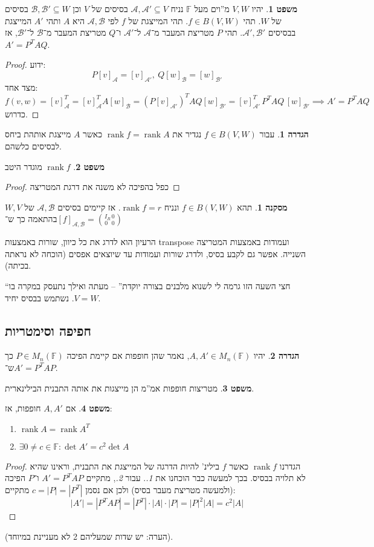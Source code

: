 \documentclass[a4paper]{article}
\newcommand\ac    {\mathcal{A}}
\newcommand\bc    {\mathcal{B}}
\DeclareMathOperator{\rk}      {rank}
\newcommand\F         {\mathbb{F}}
\newcommand\co        {\colon}
\newcommand\sof[1]    {\left | #1 \right |}
\theoremstyle{definition}
\newtheorem{Theorem}{משפט}
\newtheorem{definition}{הגדרה}
\newtheorem{Collary}{מסקנה}
\newcommand\cola [1] {\begin{Collary}#1\end{Collary}}
\newcommand\theo  [1] {\begin{Theorem}#1\end{Theorem}}
\newcommand\defi  [1] {\begin{definition}#1\end{definition}}
\begin{document}
	\theo{יהיו $V, W$ מ''וים מעל $\F$ נניח $\ac, \ac' \subseteq V$ בסיסים של $V$ וכן $\bc, \bc' \subseteq W$ בסיסים של $W$. תהי $f \in B(V, W)$. 
		תהי המייצגת של $f$ לפי $\ac, \bc$ היא $A$ ותהי $A'$ המייצגת בבסיסים $\ac', \bc'$. תהי $P$ מטריצת המעבר מ־$\ac$ ל־$\ac'$ ו־$Q$ מטריצת המעבר מ־$\bc$ ל־$\bc'$, אז $A' = P^T AQ$. 
	}
	\begin{proof}
		ידוע: 
		\[ P[v]_{\ac} = [v]_{\ac'}, \ Q[w]_\bc = [w]_{\bc'} \]
		מצד אחד: 
		\[ f(v, w) = [v]_\ac^T = [v]_{\ac}^T A [w]_\bc = (P[v]_{\ac '})^TAQ[w]_{\bc'} = [v]_{\ac'}^T \, P^T A Q \, [w]_{\bc'} \implies A' = P^T A Q \]
		כדרוש. 
	\end{proof}
	
	\defi{עבור $f \in B(V, W)$ נגדיר את $\rk f = \rk A$ כאשר $A$ מייצגת אותהת ביחס לבסיסים כלשהם. }
	\theo{$\rk f$ מוגדר היטב}
	\begin{proof}
		כפל בהפיכה לא משנה את דרגת המטריצה
	\end{proof}
	
	\cola{תהא $f \in B(V, W)$ ונניח $\rk f = r$. אז קיימים בסיסים $\ac, \bc$ של $W, V$ בהתאמה כך ש־$[f]_{\ac, \bc} = \binom{I_R \, 0}{0\,\,\,\, 0}$}
	הרעיון הוא לדרג את כל כיוון, שורות באמצעות transpose ועמודות באמצעות המטריצה השנייה. אפשר גם לקבע בסיס, ולדרג שורות ועמודות עד שיוצאים אפסים (הוכחה לא נראתה בכיתה). 
	
	``חצי השעה הזו גרמה לי לשנוא מלבנים בצורה יוקדת'' – מעתה ואילך נתעסק במקרה בו $V = W$. נשתמש בבסיס יחיד. 
	
	\subsection{חפיפה וסימטריות}
	\defi{יהיו $A, A' \in M_n(\F)$, נאמר שהן חופפות אם קיימת הפיכה $P \in M_n(\F)$ כך ש־$A' = P^TAP$. }
	\theo{מטריצות חופפות אמ''מ הן מייצגות את אותה התבנית הבילינארית. }
	\theo{אם $A, A'$ חופפות, אז: 
		\begin{enumerate}
			\item \hfil $\rk A = \rk A^T$
			\item \hfil $\exists 0 \neq c \in \F \co \det A' = c^2 \det A$
	\end{enumerate}}
	\begin{proof}
		הגדרנו $\rk f$ כאשר $f$ בילינ' להיות הדרגה של המייצגת את התבנית, וראינו שהיא לא תלויה בבסיס. בכך למעשה כבר הוכחנו את \textit{1.}. עבור \textit{2.}, מתקיים $A' = P^TAP$ ו־$P$ הפיכה (ולמעשה מטריצת מעבר בסיס) ולכן אם נסמן $c = |P| = |P^T|$ מתקיים: 
		\[ |A'| = |P^TAP| = |P^T| \cdot |A| \cdot |P| = \sof{P}^2\sof{A} = c^2 |A| \]
	\end{proof}
	(הערה: יש שדות שמעליהם 2 לא מעניינת במיוחד). 
	
\end{document}
